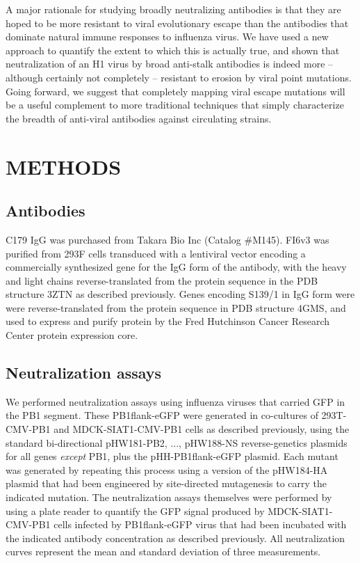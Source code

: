 \documentclass[11pt]{article}
\begin{document}
A major rationale for studying broadly neutralizing antibodies is that they are hoped to be more resistant to viral evolutionary escape than the antibodies that dominate natural immune responses to influenza virus\cite{krammer2015advances,corti2017tackling}.
We have used a new approach to quantify the extent to which this is actually true, and shown that neutralization of an H1 virus by broad anti-stalk antibodies is indeed more -- although certainly not completely -- resistant to erosion by viral point mutations.
Going forward, we suggest that completely mapping viral escape mutations will be a useful complement to more traditional techniques that simply characterize the breadth of anti-viral antibodies against circulating strains.

\clearpage
\small

\section*{METHODS}
\label{sec:methods}
\subsection*{Antibodies}
C179 IgG was purchased from Takara Bio Inc (Catalog \#M145).
FI6v3 was purified from 293F cells transduced with a lentiviral vector encoding a commercially synthesized gene for the IgG form of the antibody, with the heavy and light chains reverse-translated from the protein sequence in the PDB structure 3ZTN\cite{corti2011neutralizing} as described previously\cite{balazs2013broad}.
Genes encoding S139/1 in IgG form were were reverse-translated from the protein sequence in PDB structure 4GMS\cite{lee2012heterosubtypic}, and used to express and purify protein by the Fred Hutchinson Cancer Research Center protein expression core.

\subsection*{Neutralization assays}
We performed neutralization assays using influenza viruses that carried GFP in the PB1 segment.
These PB1flank-eGFP were generated in co-cultures of 293T-CMV-PB1 and MDCK-SIAT1-CMV-PB1 cells as described previously\cite{bloom2010permissive}, using the standard bi-directional pHW181-PB2, ..., pHW188-NS reverse-genetics plasmids\cite{hoffmann2000dna} for all genes \emph{except} PB1, plus the pHH-PB1flank-eGFP plasmid\cite{bloom2010permissive}.
Each mutant was generated by repeating this process using a version of the pHW184-HA plasmid that had been engineered by site-directed mutagenesis to carry the indicated mutation.
The neutralization assays themselves were performed by using a plate reader to quantify the GFP signal produced by MDCK-SIAT1-CMV-PB1 cells infected by PB1flank-eGFP virus that had been incubated with the indicated antibody concentration as described previously\cite{hooper2013mutant}.
All neutralization curves represent the mean and standard deviation of three measurements. 
\end{document}
